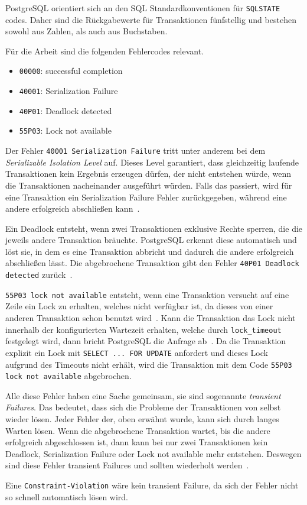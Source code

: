 
PostgreSQL orientiert sich an den SQL Standardkonventionen für \texttt{SQLSTATE} codes.
Daher sind die Rückgabewerte für Transaktionen fünfstellig und bestehen sowohl aus Zahlen, als auch aus Buchstaben.

Für die Arbeit sind die folgenden Fehlercodes relevant.
\begin{itemize}
	\item \texttt{00000}: successful completion
	\item \texttt{40001}: Serialization Failure
	\item \texttt{40P01}: Deadlock detected
	\item \texttt{55P03}: Lock not available
\end{itemize}
Der Fehler \texttt{40001 Serialization Failure} tritt unter anderem bei dem \emph{Serializable Isolation Level} auf.
Dieses Level garantiert, dass gleichzeitig laufende Transaktionen kein Ergebnis erzeugen dürfen, der nicht entstehen
würde, wenn die Transaktionen nacheinander ausgeführt würden.
Falls das passiert, wird für eine Transaktion ein Serialization Failure Fehler zurückgegeben, während eine andere
erfolgreich abschließen kann~\cite{PostgreSQLSerializable}.

Ein Deadlock entsteht, wenn zwei Transaktionen exklusive Rechte sperren, die die jeweils andere Transaktion bräuchte.
PostgreSQL erkennt diese automatisch und löst sie, in dem es eine Transaktion abbricht und dadurch die andere
erfolgreich abschließen lässt.
Die abgebrochene Transaktion gibt den Fehler \texttt{40P01 Deadlock detected} zurück~\cite{PostgreSQLDeadlocks}.

\texttt{55P03 lock not available} entsteht, wenn eine Transaktion versucht auf eine Zeile ein Lock zu erhalten,
welches nicht verfügbar ist, da dieses von einer anderen Transaktion schon benutzt wird~\cite{PostgreSQLRowLocks}.
Kann die Transaktion das Lock nicht innerhalb der konfigurierten Wartezeit erhalten, welche durch
\texttt{lock\_timeout} festgelegt wird, dann bricht PostgreSQL die Anfrage ab~\cite{PostgreSQLClientDefaults}.
Da die Transaktion explizit ein Lock mit \texttt{SELECT ... FOR UPDATE} anfordert und dieses Lock aufgrund des Timeouts
nicht erhält, wird die Transaktion mit dem Code \texttt{55P03 lock not available} abgebrochen.

Alle diese Fehler haben eine Sache gemeinsam, sie sind sogenannte \emph{transient Failures}.
Das bedeutet, dass sich die Probleme der Transaktionen von selbst wieder lösen.
Jeder Fehler der, oben erwähnt wurde, kann sich durch langes Warten lösen.
Wenn die abgebrochene Transaktion wartet, bis die andere erfolgreich abgeschlossen ist, dann kann bei nur zwei
Transaktionen kein Deadlock, Serialization Failure oder Lock not available mehr entstehen.
Deswegen sind diese Fehler transient Failures und sollten wiederholt werden~\cite{MicrosoftRetryPattern}.

Eine \texttt{Constraint-Violation} wäre kein transient Failure, da sich der Fehler nicht so schnell automatisch lösen
wird.